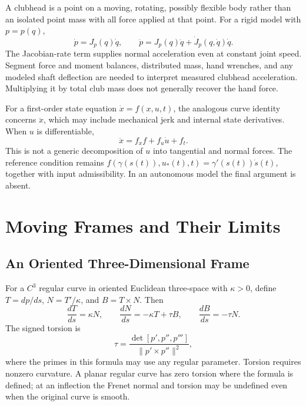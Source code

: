 \documentclass[12pt, openany]{book}
\theoremstyle{plain}
\begin{document}
A clubhead is a point on a moving, rotating, possibly flexible body rather
than an isolated point mass with all force applied at that point. For a
rigid model with $p=p(q)$,
\begin{equation}
 \dot p=J_p(q)\dot q,\qquad
 \ddot p=J_p(q)\ddot q+\dot J_p(q,\dot q)\dot q.
\end{equation}
The Jacobian-rate term supplies normal acceleration even at constant joint
speed. Segment force and moment balances, distributed mass, hand wrenches,
and any modeled shaft deflection are needed to interpret measured clubhead
acceleration. Multiplying it by total club mass does not generally recover
the hand force.

For a first-order state equation $\dot x=f(x,u,t)$, the analogous curve
identity concerns $\ddot x$, which may include mechanical jerk and internal
state derivatives. When $u$ is differentiable,
\begin{equation}
 \ddot x=f_xf+f_u\dot u+f_t.
\end{equation}
This is not a generic decomposition of $u$ into tangential and normal
forces. The reference condition remains
$f(\gamma(s(t)),u_*(t),t)=\gamma'(s(t))\dot s(t)$, together with input
admissibility. In an autonomous model the final argument is absent.

\section{Moving Frames and Their Limits}

\subsection{An Oriented Three-Dimensional Frame}

For a $C^3$ regular curve in oriented Euclidean three-space with $\kappa>0$,
define $T=dp/ds$, $N=T'/\kappa$, and $B=T\times N$. Then
\begin{equation}\label{eq:frenet_serret}
 \frac{dT}{ds}=\kappa N,\qquad
 \frac{dN}{ds}=-\kappa T+\tau B,\qquad
 \frac{dB}{ds}=-\tau N.
\end{equation}
The signed torsion is
\begin{equation}
 \tau=\frac{\det[p',p'',p''']}{\|p'\times p''\|^2},
\end{equation}
where the primes in this formula may use any regular parameter. Torsion
requires nonzero curvature. A planar regular curve has zero torsion where
the formula is defined; at an inflection the Frenet normal and torsion may
be undefined even when the original curve is smooth.
\end{document}

